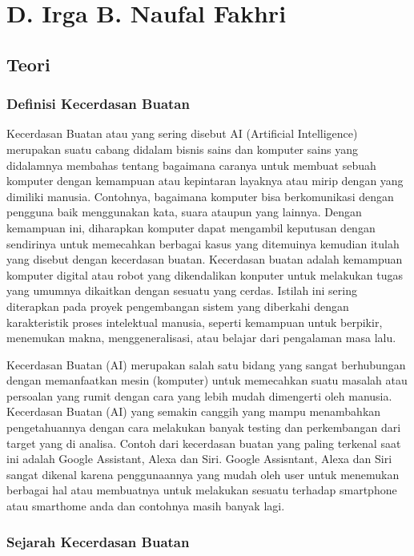 \section{D. Irga B. Naufal Fakhri}
\subsection{Teori}
\subsubsection{Definisi Kecerdasan Buatan}

Kecerdasan Buatan atau yang sering disebut AI (Artificial Intelligence) merupakan suatu cabang didalam bisnis sains dan komputer sains yang didalamnya membahas tentang bagaimana caranya untuk membuat sebuah komputer dengan kemampuan atau kepintaran layaknya atau mirip dengan yang dimiliki manusia. 
Contohnya, bagaimana komputer bisa berkomunikasi dengan pengguna baik menggunakan kata, suara ataupun yang lainnya. 
Dengan kemampuan ini, diharapkan komputer dapat mengambil keputusan dengan sendirinya untuk memecahkan berbagai kasus yang ditemuinya kemudian itulah yang disebut dengan kecerdasan buatan. 
Kecerdasan buatan adalah kemampuan komputer digital atau robot yang dikendalikan konputer untuk melakukan tugas yang umumnya dikaitkan dengan sesuatu yang cerdas. Istilah ini sering diterapkan pada proyek pengembangan sistem yang diberkahi dengan karakteristik proses intelektual manusia, seperti kemampuan untuk berpikir, menemukan makna, menggeneralisasi, atau belajar dari pengalaman masa lalu.

Kecerdasan Buatan (AI) merupakan salah satu bidang yang sangat berhubungan dengan memanfaatkan mesin (komputer) untuk memecahkan suatu masalah atau persoalan yang rumit dengan cara yang lebih mudah dimengerti oleh manusia. Kecerdasan Buatan (AI) yang semakin canggih yang mampu menambahkan pengetahuannya dengan cara melakukan banyak testing dan perkembangan dari target yang di analisa. Contoh dari kecerdasan buatan yang paling terkenal saat ini adalah Google Assistant, Alexa dan Siri. Google Assisntant, Alexa dan Siri sangat dikenal karena penggunaannya yang mudah oleh user untuk menemukan berbagai hal atau membuatnya untuk melakukan sesuatu terhadap smartphone atau smarthome anda dan contohnya masih banyak lagi.

\subsubsection{Sejarah Kecerdasan Buatan}

